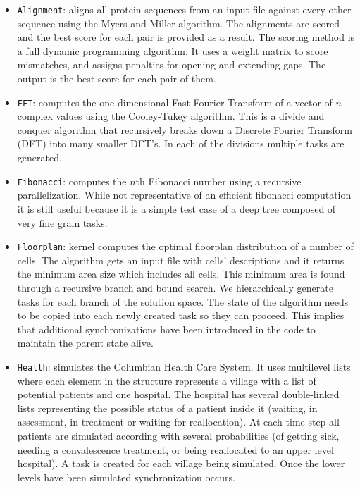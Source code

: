 \documentclass[sigconf]{acmart}
\begin{document}
\begin{itemize}
\item \texttt{Alignment}: aligns all protein sequences from  an  input
file  against  every  other  sequence  using  the Myers and Miller
algorithm. The alignments are scored and the best score for each pair is
provided as a result. The scoring method is  a  full  dynamic  programming
algorithm. It uses  a  weight matrix to score mismatches, and assigns
penalties for opening and extending gaps. The output is the best score for each
pair of them.
\item \texttt{FFT}: computes the one-dimensional Fast Fourier Transform
of a vector of $n$ complex values using the Cooley-Tukey
algorithm. This is a divide and conquer algorithm that  recursively  breaks
down a Discrete Fourier Transform (DFT) into many smaller DFT’s. In each of the
divisions multiple tasks are generated.
\item \texttt{Fibonacci}: computes the $n$th Fibonacci number using a  recursive
parallelization. While  not  representative  of  an efficient  fibonacci
computation  it  is  still  useful  because  it  is a simple test case of a
deep tree composed of very fine grain tasks.
\item \texttt{Floorplan}: kernel computes the optimal floorplan distribution
of a number of cells. The algorithm gets an input file with  cells'
descriptions  and  it  returns  the  minimum  area  size which includes all
cells. This minimum area is found through a recursive branch and bound search.
We hierarchically generate tasks  for  each  branch  of  the  solution  space.
The  state  of  the algorithm needs to be copied into each newly created task
so they can proceed. This implies that additional synchronizations have been
introduced in the code to maintain the parent state alive.
\item \texttt{Health}: simulates the Columbian Health Care System. It
uses multilevel lists where each element in the structure  represents  a
village with  a  list  of  potential patients and one hospital. The hospital
has several double-linked lists representing the possible status of a patient
inside it (waiting, in assessment,   in   treatment   or   waiting   for
reallocation).  At  each time step  all  patients  are  simulated  according
with several probabilities (of getting sick, needing a convalescence treatment,
or  being  reallocated to  an  upper  level  hospital).  A  task  is  created
for  each  village being  simulated. Once the lower levels have been simulated
synchronization occurs.

\end{itemize}
\end{document}
